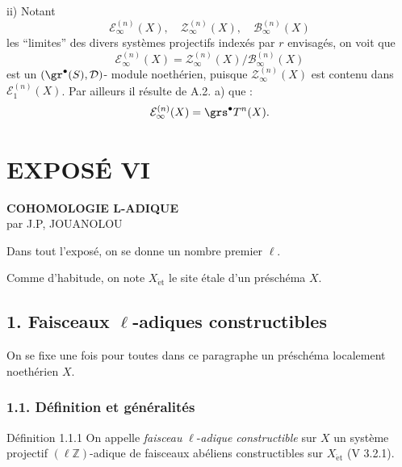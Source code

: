 \begin{prooftext}
ii) Notant
\[
\mathcal{E}_\infty^{(n)}(X),\quad
\mathcal{Z}_\infty^{(n)}(X),\quad
\mathcal{B}_\infty^{(n)}(X)
\]
les ``limites'' des divers systèmes projectifs indexés par \(r\) envisagés, on voit que
\[
\mathcal{E}_\infty^{(n)}(X)=
\mathcal{Z}_\infty^{(n)}(X)/\mathcal{B}_\infty^{(n)}(X)
\]
est un \((\gr^\bullet(S),\mathcal{D})\)-
module noethérien, puisque \(\mathcal{Z}_\infty^{(n)}(X)\) est contenu dans \(\mathcal{E}_1^{(n)}(X)\). Par ailleurs il résulte de A.2. a) que :
\[
\mathcal{E}_\infty^{(n)}(X)=\grs^\bullet T^n(X).
\]
\end{prooftext}

\renewenvironment{prooftext}[1][Proof]{\par\noindent\emph{#1.}\ }{\par\medskip}
\section*{EXPOSÉ VI}

\begin{center}
\textbf{COHOMOLOGIE L-ADIQUE}\\[0.5em]
par J.P, JOUANOLOU
\end{center}

Dans tout l'exposé, on se donne un nombre premier \(\ell\).

Comme d'habitude, on note \(X_{\mathrm{\acute et}}\) le site étale d'un préschéma \(X\).

\subsection*{1. Faisceaux \(\ell\)-adiques constructibles}

On se fixe une fois pour toutes dans ce paragraphe un préschéma localement noethérien \(X\).

\subsubsection*{1.1. Définition et généralités}

\begin{statement}{Définition 1.1.1}
On appelle \emph{faisceau} \(\ell\)-\emph{adique constructible} sur \(X\) un système projectif \((\ell\mathbb{Z})\)-adique de faisceaux abéliens constructibles sur \(X_{\mathrm{\acute et}}\) (V 3.2.1).
\end{statement}

